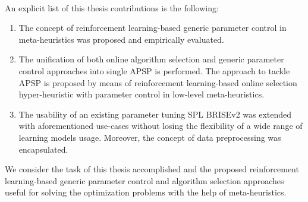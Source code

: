 \paragraph{}
An explicit list of this thesis contributions is the following:
\begin{enumerate}
	\item The concept of reinforcement learning-based generic parameter control in meta-heuristics was proposed and empirically evaluated.%
	
	\item The unification of both online algorithm selection and generic parameter control approaches into single APSP is performed. The approach to tackle APSP is proposed by means of reinforcement learning-based online selection hyper-heuristic with parameter control in low-level meta-heuristics.

	\item The usability of an existing parameter tuning SPL BRISEv2 was extended with aforementioned use-cases without losing the flexibility of a wide range of learning models usage. Moreover, the concept of data preprocessing was encapsulated.
\end{enumerate}

We consider the task of this thesis accomplished and the proposed reinforcement learning-based generic parameter control and algorithm selection approaches useful for solving the optimization problems with the help of meta-heuristics.